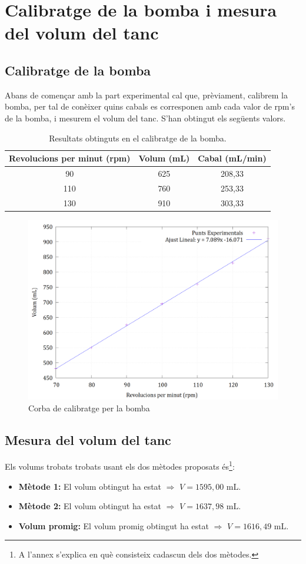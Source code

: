 \documentclass[10pt, twoside]{article}
\begin{document}
\section{Calibratge de la bomba i mesura del volum del tanc}
\subsection{Calibratge de la bomba}
Abans de començar amb la part experimental cal que, prèviament, calibrem la bomba, per tal de conèixer quins cabals es corresponen amb cada valor de rpm's de la bomba, i mesurem el volum del tanc. S'han obtingut els següents valors.
\begin{table}[h!]
    \centering
    \caption{Resultats obtinguts en el calibratge de la bomba.}
    \label{tab1}
    \begin{tabular}{|c|c|c|} %
    \hline
    Revolucions per minut (rpm) & Volum (mL) & Cabal (mL/min) \\ \hline
    90       & 625       & 208,33       \\ \hline
    110      & 760       & 253,33       \\ \hline
    130      & 910       & 303,33       \\ \hline
    \end{tabular}
\end{table}
 
\begin{figure}[h]
    \centering
    \includegraphics[width=0.7\linewidth]{calbombagnu.png}
    \caption{Corba de calibratge per la bomba}
    \label{fig1}
\end{figure}
 
\subsection{Mesura del volum del tanc}
Els volums trobats trobats usant els dos mètodes proposats és\footnote{A l'annex s'explica en què consisteix cadascun dels dos mètodes.}:
\begin{itemize}
    \item \textbf{Mètode 1: }El volum obtingut ha estat $\Rightarrow$ $\boxed{V = 1595,00 \text{ mL}}$.
    \item \textbf{Mètode 2: }El volum obtingut ha estat $\Rightarrow$ $\boxed{V = 1637,98 \text{ mL}}$.
    \item \textbf{Volum promig: }El volum promig obtingut ha estat $\Rightarrow$ $\boxed{V = 1616,49 \text{ mL}}$.
\end{itemize}
\end{document}
